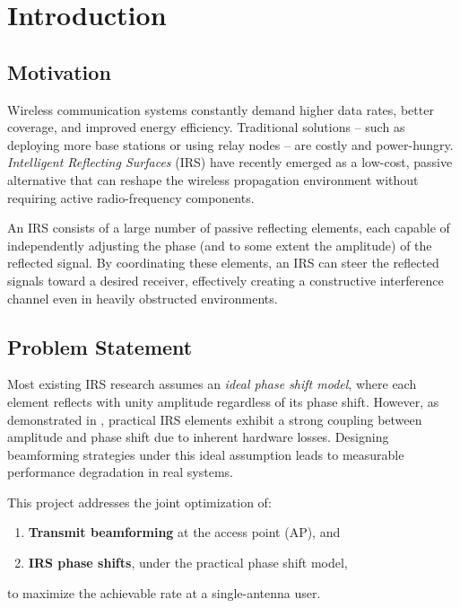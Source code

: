 \documentclass[12pt, a4paper]{article}
\begin{document}
\tableofcontents
\newpage

\section{Introduction}
\label{sec:intro}

\subsection{Motivation}
Wireless communication systems constantly demand higher data rates, better coverage,
and improved energy efficiency. Traditional solutions -- such as deploying more base
stations or using relay nodes -- are costly and power-hungry. \textit{Intelligent
Reflecting Surfaces} (IRS) have recently emerged as a low-cost, passive alternative
that can reshape the wireless propagation environment without requiring active
radio-frequency components.

An IRS consists of a large number of passive reflecting elements, each capable of
independently adjusting the phase (and to some extent the amplitude) of the reflected
signal. By coordinating these elements, an IRS can steer the reflected signals toward
a desired receiver, effectively creating a constructive interference channel even in
heavily obstructed environments.

\subsection{Problem Statement}
Most existing IRS research assumes an \textit{ideal phase shift model}, where each
element reflects with unity amplitude regardless of its phase shift. However, as
demonstrated in \cite{abeywickrama2020}, practical IRS elements exhibit a strong
coupling between amplitude and phase shift due to inherent hardware losses. Designing
beamforming strategies under this ideal assumption leads to measurable performance
degradation in real systems.

This project addresses the joint optimization of:
\begin{enumerate}
    \item \textbf{Transmit beamforming} at the access point (AP), and
    \item \textbf{IRS phase shifts}, under the practical phase shift model,
\end{enumerate}
to maximize the achievable rate at a single-antenna user.
\end{document}

